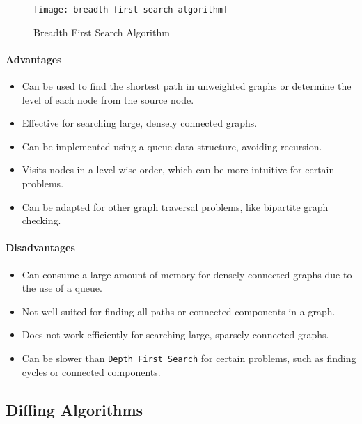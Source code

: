\begin{figure}[htbp]
    \centering
    \texttt{[image: breadth-first-search-algorithm]}
    \caption{Breadth First Search Algorithm \cite{zaltsman_dfs_bfs}}
    \label{fig:breadth-first-search-algorithm}
\end{figure}

\paragraph{Advantages}
\begin{itemize}
    \item Can be used to find the shortest path in unweighted graphs or determine the level of each node from the source node.
    \item Effective for searching large, densely connected graphs.
    \item Can be implemented using a queue data structure, avoiding recursion.
    \item Visits nodes in a level-wise order, which can be more intuitive for certain problems.
    \item Can be adapted for other graph traversal problems, like bipartite graph checking.
\end{itemize}
\paragraph{Disadvantages}
\begin{itemize}
    \item Can consume a large amount of memory for densely connected graphs due to the use of a queue.
    \item Not well-suited for finding all paths or connected components in a graph.
    \item Does not work efficiently for searching large, sparsely connected graphs.
    \item Can be slower than \lstinline{Depth First Search} for certain problems, such as finding cycles or connected components.
\end{itemize}


\subsection{Diffing Algorithms}

